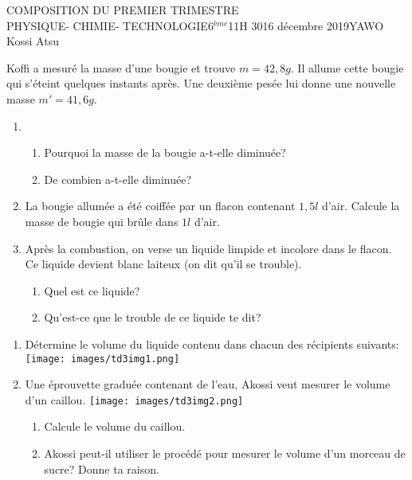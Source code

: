 \documentclass[12pt,a4paper]{book}
\newcommand{\prof}{YAWO Kossi Atsu}
\newcommand{\matiere}{\\PHYSIQUE- CHIMIE- TECHNOLOGIE}
\newcommand{\classe}{6$^{ème}$}
\begin{document}
\newpage
\begin{devoir}{COMPOSITION DU PREMIER TRIMESTRE}{\matiere}{\classe}{1}{1H 30}{16 décembre 2019}{\prof}
\begin{exo}[5]
Koffi a mesuré la masse d'une bougie et trouve $m=42,8g$. Il allume cette bougie qui s'éteint quelques instants après. Une deuxième pesée lui donne une nouvelle masse $m'=41,6g$.
\begin{enumerate}
\item \begin{enumerate}
\item Pourquoi la masse de la bougie a-t-elle diminuée?
\item De combien a-t-elle diminuée?
\end{enumerate}
\item La bougie allumée a été coiffée par un flacon contenant $1,5l$ d'air. Calcule la masse de bougie qui brûle dans $1l$ d'air.
\item Après la combustion, on verse un liquide limpide et incolore dans le flacon. Ce liquide devient blanc laiteux (on dit qu'il se trouble).
\begin{enumerate}
\item Quel est ce liquide?
\item Qu'est-ce que le trouble de ce liquide te dit?
\end{enumerate}
\end{enumerate}
\end{exo}

\begin{exo}[6]
\begin{enumerate}
\item Détermine le volume du liquide contenu dans chacun des récipients suivants:
\texttt{[image: images/td3img1.png]}
\item Une éprouvette graduée contenant de l'eau, Akossi veut mesurer le volume d'un caillou.
\texttt{[image: images/td3img2.png]}
\begin{enumerate}
\item Calcule le volume du caillou.
\item Akossi peut-il utiliser le procédé pour mesurer le volume d'un morceau de sucre? Donne ta raison.
\end{enumerate}
\end{enumerate}
\end{exo}


\end{devoir}
\end{document}
